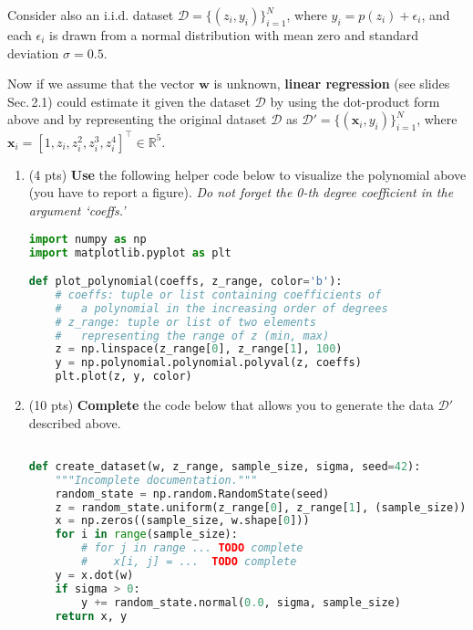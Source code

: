 \documentclass[a4paper,11pt]{article}
\begin{document}
Consider also an i.i.d. dataset $\mathcal{D} = \{ (z_i, y_i) \}_{i=1}^N$,
where $y_i = p(z_i) + \epsilon_i$, and each $\epsilon_i$ is drawn from
a normal distribution with mean zero and standard deviation $\sigma = 0.5$.

Now if we assume that the vector $\mathbf{w}$ is unknown,
\textbf{linear regression} (see slides Sec.\,2.1) could estimate it given the dataset $\mathcal{D}$ by using the dot-product form above and by representing the original dataset $\mathcal{D}$ as
$\mathcal{D}' = \{ (\mathbf{x}_i, y_i) \}_{i=1}^N$, where $\mathbf{x}_i = [1, z_i, z_i^2, z_i^3, z_i^4]^\intercal \in \mathbb{R}^5$. 

\begin{enumerate}
\item (4 pts) \textbf{Use} the following helper code below to visualize the polynomial above (you have to report a figure). \textit{Do not forget the 0-th degree coefficient in the argument `coeffs.'}
 \begin{lstlisting}[language=Python, frame=tb, caption=Helper function to visualize a polynomial.]
import numpy as np
import matplotlib.pyplot as plt

def plot_polynomial(coeffs, z_range, color='b'):
    # coeffs: tuple or list containing coefficients of
    #   a polynomial in the increasing order of degrees
    # z_range: tuple or list of two elements 
    #   representing the range of z (min, max)
    z = np.linspace(z_range[0], z_range[1], 100)
    y = np.polynomial.polynomial.polyval(z, coeffs)
    plt.plot(z, y, color)
\end{lstlisting}
\item (10 pts) \textbf{Complete} the code below that allows you to generate the data $\mathcal{D}'$ described above.
 \begin{lstlisting}[language=Python, frame=tb, caption=Polynomial regression dataset generation (incomplete).]

def create_dataset(w, z_range, sample_size, sigma, seed=42):
    """Incomplete documentation."""
    random_state = np.random.RandomState(seed)
    z = random_state.uniform(z_range[0], z_range[1], (sample_size))
    x = np.zeros((sample_size, w.shape[0]))
    for i in range(sample_size):
        # for j in range ... TODO complete
        #    x[i, j] = ...  TODO complete
    y = x.dot(w)
    if sigma > 0:
        y += random_state.normal(0.0, sigma, sample_size)
    return x, y
 \end{lstlisting}



\end{enumerate}
\end{document}
